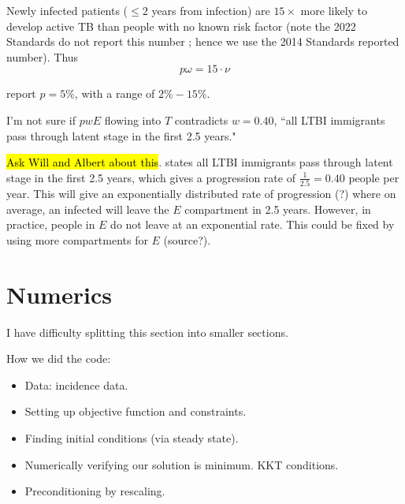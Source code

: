 \documentclass[sn-mathphys,Numbered]{sn-jnl}%
\theoremstyle{thmstyleone}%
\theoremstyle{thmstyletwo}%
\theoremstyle{thmstylethree}%
\begin{document}
Newly infected patients ($\leq2$ years from infection) are $15\times$ more likely to develop active TB than people with no known risk factor \cite{PublicHealthAgencyofCanada2014CanadianStandards.} (note the 2022 Standards \cite{Campbell2022ChapterInfection} do not report this number ; hence we use the 2014 Standards \cite{PublicHealthAgencyofCanada2014CanadianStandards.} reported number).  Thus $$ p\omega = 15 \cdot \nu  $$

\cite{Jacquet2006} report $p=5\%$, with a range of $2\%-15\%$.

I'm not sure if $pwE$ flowing into $T$ contradicts $w=0.40$, ``all LTBI immigrants pass through latent stage in the first 2.5 years."

\hl{Ask Will and Albert about this}.  \cite{Ziv2001} states all LTBI immigrants pass through latent stage in the first 2.5 years, which gives a progression rate of $\frac{1}{2.5}=0.40$ people per year.  This will give an exponentially distributed rate of progression (?) where on average, an infected will leave the $E$ compartment in 2.5 years.  However, in practice, people in $E$ do not leave at an exponential rate.  This could be fixed by using more compartments for $E$ (source?).






\section{Numerics}

I have difficulty splitting this section into smaller sections.  

How we did the code:
\begin{itemize}
    \item Data: incidence data.
    \item Setting up objective function and constraints.
    \item Finding initial conditions (via steady state).
    \item Numerically verifying our solution is minimum.  KKT conditions.
    \item Preconditioning by rescaling. 
\end{itemize}
\end{document}
